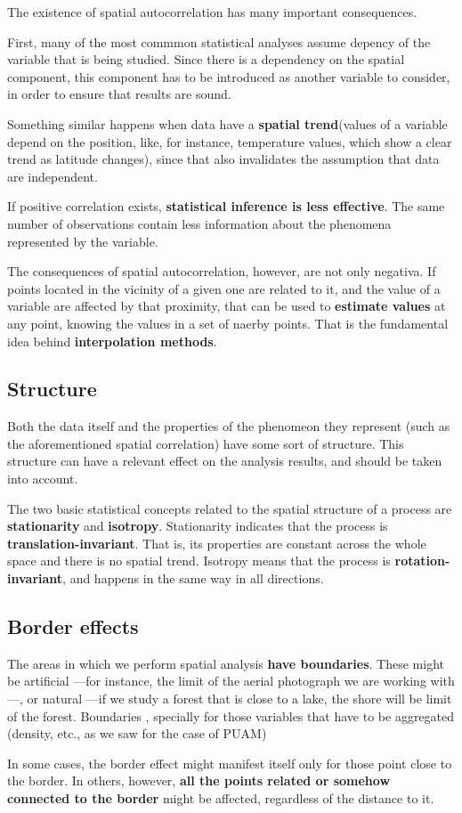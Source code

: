 The existence of spatial autocorrelation has many important consequences.

First, many of the most commmon statistical analyses assume depency of the variable that is being studied. Since there is a dependency on the spatial component, this component has to be introduced as another variable to consider, in order to ensure that results are sound.


Something similar happens when data have a \textbf{spatial trend}(values of a variable depend on the position, like, for instance, temperature values, which show a clear trend as latitude changes), since that also invalidates the assumption that data are independent.

If positive correlation exists, \textbf{statistical inference is less effective}. The same number of observations contain less information about the phenomena represented by the variable.

The consequences of spatial autocorrelation, however, are not only negativa. If points located in the vicinity of a given one are related to it, and the value of a variable are affected by that proximity, that can be used to \textbf{estimate values} at any point, knowing the values in a set of naerby points. That is the fundamental idea behind \textbf{interpolation methods}.


\subsection{Structure}

Both the data itself and the properties of the phenomeon they represent (such as the aforementioned spatial correlation) have some sort of structure. This structure can have a relevant effect on the analysis results, and should be taken into account.

The two basic statistical concepts related to the spatial structure of a process are \textbf{stationarity} and \textbf{isotropy}. Stationarity indicates that the process is \textbf{translation-invariant}. That is, its properties are constant across the whole space and there is no spatial trend. Isotropy means that the process is \textbf{rotation-invariant}, and happens in the same way in all directions.

\subsection{Border effects}

The areas in which we perform spatial analysis \textbf{have boundaries}. These might be artificial ---for instance, the limit of the aerial photograph we are working with---, or natural ---if we study a forest that is close to a lake, the shore will be limit of the forest. Boundaries , specially for those variables that have to be aggregated (density, etc., as we saw for the case of PUAM)

In some cases, the border effect might manifest itself only for those point close to the border. In others, however, \textbf{all the points related or somehow connected to the border} might be affected, regardless of the distance to it.

\pagestyle{empty}